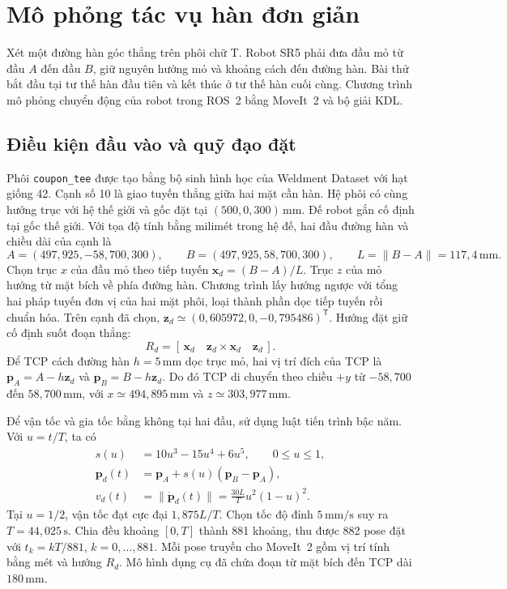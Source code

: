 \clearpage
\section{Mô phỏng tác vụ hàn đơn giản}
Xét một đường hàn góc thẳng trên phôi chữ T. Robot SR5 phải đưa đầu mỏ từ đầu \(A\) đến đầu \(B\), giữ nguyên hướng mỏ và khoảng cách đến đường hàn. Bài thử bắt đầu tại tư thế hàn đầu tiên và kết thúc ở tư thế hàn cuối cùng. Chương trình mô phỏng chuyển động của robot trong ROS~2 bằng MoveIt~2 và bộ giải KDL.

\subsection{Điều kiện đầu vào và quỹ đạo đặt}
Phôi \texttt{coupon\_tee} được tạo bằng bộ sinh hình học của Weldment Dataset với hạt giống 42. Cạnh số 10 là giao tuyến thẳng giữa hai mặt cần hàn. Hệ phôi có cùng hướng trục với hệ thế giới và gốc đặt tại \((500,0,300)\,\mathrm{mm}\). Đế robot gắn cố định tại gốc thế giới. Với tọa độ tính bằng milimét trong hệ đế, hai đầu đường hàn và chiều dài của cạnh là
\[
  A=(497{,}925,-58{,}700,300),\qquad B=(497{,}925,58{,}700,300),
  \qquad L=\|B-A\|=117{,}4\,\mathrm{mm}.
\]
Chọn trục \(x\) của đầu mỏ theo tiếp tuyến \(\mathbf x_d=(B-A)/L\). Trục \(z\) của mỏ hướng từ mặt bích về phía đường hàn. Chương trình lấy hướng ngược với tổng hai pháp tuyến đơn vị của hai mặt phôi, loại thành phần dọc tiếp tuyến rồi chuẩn hóa. Trên cạnh đã chọn, \(\mathbf z_d\simeq(0{,}605972,0,-0{,}795486)^{\mathsf T}\). Hướng đặt giữ cố định suốt đoạn thẳng:
\[
  R_d=[\,\mathbf x_d\quad\mathbf z_d\times\mathbf x_d\quad\mathbf z_d\,].
\]
Để TCP cách đường hàn \(h=5\,\mathrm{mm}\) dọc trục mỏ, hai vị trí đích của TCP là \(\mathbf p_A=A-h\mathbf z_d\) và \(\mathbf p_B=B-h\mathbf z_d\). Do đó TCP di chuyển theo chiều \(+y\) từ \(-58{,}700\) đến \(58{,}700\,\mathrm{mm}\), với \(x\simeq494{,}895\,\mathrm{mm}\) và \(z\simeq303{,}977\,\mathrm{mm}\).

Để vận tốc và gia tốc bằng không tại hai đầu, sử dụng luật tiến trình bậc năm. Với \(u=t/T\), ta có
\begin{align}
 s(u)&=10u^3-15u^4+6u^5,\qquad 0\le u\le1,\\
 \mathbf p_d(t)&=\mathbf p_A+s(u)(\mathbf p_B-\mathbf p_A),\\
 v_d(t)&=\|\dot{\mathbf p}_d(t)\|=\frac{30L}{T}u^2(1-u)^2 .
\end{align}
Tại \(u=1/2\), vận tốc đạt cực đại \(1{,}875L/T\). Chọn tốc độ đỉnh \(5\,\mathrm{mm/s}\) suy ra \(T=44{,}025\,\mathrm{s}\). Chia đều khoảng \([0,T]\) thành 881 khoảng, thu được 882 pose đặt với \(t_k=kT/881\), \(k=0,\ldots,881\). Mỗi pose truyền cho MoveIt~2 gồm vị trí tính bằng mét và hướng \(R_d\). Mô hình dụng cụ đã chứa đoạn từ mặt bích đến TCP dài \(180\,\mathrm{mm}\).

